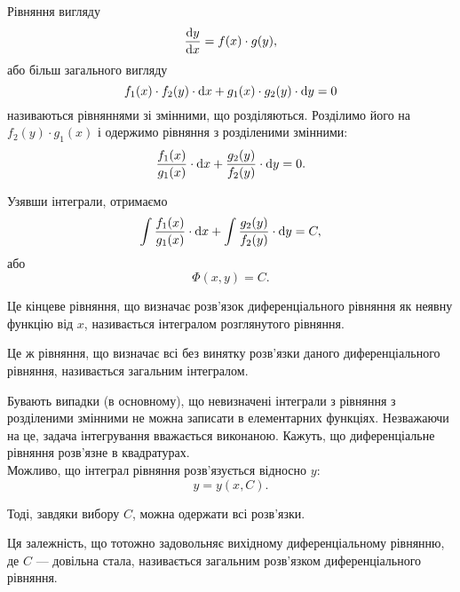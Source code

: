 Рівняння вигляду
\begin{equation*}
	\frac{\mathop{}\!\mathrm{d} y}{\mathop{}\!\mathrm{d} x} = f(x) \cdot g(y),
\end{equation*}
або більш загального вигляду
\begin{equation*}
	f_1(x) \cdot f_2(y) \cdot \mathop{}\!\mathrm{d} x + g_1(x) \cdot g_2(y) \cdot \mathop{}\!\mathrm{d} y = 0
\end{equation*}
називаються рівняннями зі змінними, що розділяються. Розділимо його на $f_2(y) \cdot g_1(x)$ і одержимо рівняння з розділеними змінними:
\begin{equation*}
	\frac{f_1(x)}{g_1(x)} \cdot \mathop{}\!\mathrm{d} x + \frac{g_2(y)}{f_2(y)} \cdot \mathop{}\!\mathrm{d} y = 0.
\end{equation*}

Узявши інтеграли, отримаємо
\begin{equation*}
	\int \frac{f_1(x)}{g_1(x)} \cdot \mathop{}\!\mathrm{d} x + \int \frac{g_2(y)}{f_2(y)} \cdot \mathop{}\!\mathrm{d} y = C,
\end{equation*}
або 
\begin{equation*}
	\Phi(x, y) = C.
\end{equation*}

\begin{definition}
	Це кінцеве рівняння, що визначає розв'язок диференціального рівняння як неявну функцію від $x$, називається інтегралом розглянутого рівняння.
\end{definition}

\begin{definition}
	Це ж рівняння, що визначає всі без винятку розв'язки даного диференціального рівняння, називається загальним інтегралом.
\end{definition}

Бувають випадки (в основному), що невизначені інтеграли з рівняння з розділеними змінними не можна записати в елементарних функціях. Незважаючи на це, задача інтегрування вважається виконаною. Кажуть, що диференціальне рівняння розв'язне в квадратурах. \\

Можливо, що інтеграл рівняння розв'язується відносно $y$: 
\begin{equation*}
	y = y(x, C).
\end{equation*} 

Тоді, завдяки вибору $C$, можна одержати всі розв'язки. 

\begin{definition}
	Ця залежність, що тотожно задовольняє вихідному диференціальному рівнянню, де $C$ --- довільна стала, називається загальним розв'язком диференціального рівняння.
\end{definition}


